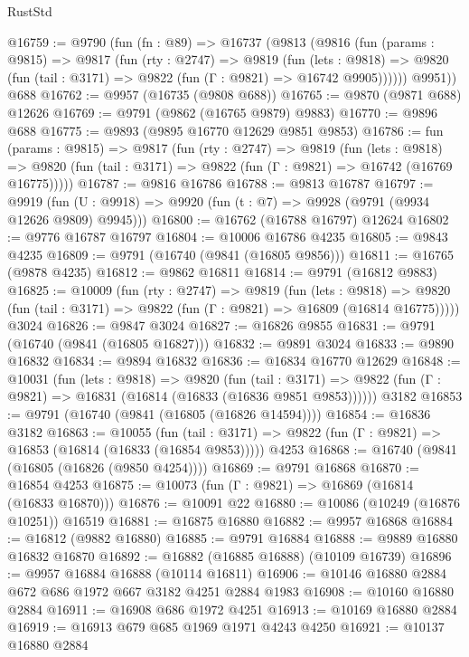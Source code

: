 \begin{lexlean}{RustStd}
\begin{coremodule}
@16759 := @9790
    (fun (fn : @89) =>
    @16737
      (@9813
        (@9816
          (fun (params : @9815) =>
          @9817
            (fun (rty : @2747) =>
            @9819
              (fun (lets : @9818) =>
              @9820 (fun (tail : @3171) => @9822 (fun (Γ : @9821) => @16742 @9905))))))
        @9951))
    @688
@16762 := @9957 (@16735 (@9808 @688))
@16765 := @9870 (@9871 @688) @12626
@16769 := @9791 (@9862 (@16765 @9879) @9883)
@16770 := @9896 @688
@16775 := @9893 (@9895 @16770 @12629 @9851 @9853)
@16786 := fun (params : @9815) =>
  @9817
    (fun (rty : @2747) =>
    @9819
      (fun (lets : @9818) =>
      @9820 (fun (tail : @3171) => @9822 (fun (Γ : @9821) => @16742 (@16769 @16775)))))
@16787 := @9816 @16786
@16788 := @9813 @16787
@16797 := @9919
    (fun (U : @9918) => @9920 (fun (t : @7) => @9928 (@9791 (@9934 @12626 @9809) @9945)))
@16800 := @16762 (@16788 @16797) @12624
@16802 := @9776 @16787 @16797
@16804 := @10006 @16786 @4235
@16805 := @9843 @4235
@16809 := @9791 (@16740 (@9841 (@16805 @9856)))
@16811 := @16765 (@9878 @4235)
@16812 := @9862 @16811
@16814 := @9791 (@16812 @9883)
@16825 := @10009
    (fun (rty : @2747) =>
    @9819
      (fun (lets : @9818) =>
      @9820 (fun (tail : @3171) => @9822 (fun (Γ : @9821) => @16809 (@16814 @16775)))))
    @3024
@16826 := @9847 @3024
@16827 := @16826 @9855
@16831 := @9791 (@16740 (@9841 (@16805 @16827)))
@16832 := @9891 @3024
@16833 := @9890 @16832
@16834 := @9894 @16832
@16836 := @16834 @16770 @12629
@16848 := @10031
    (fun (lets : @9818) =>
    @9820
      (fun (tail : @3171) =>
      @9822 (fun (Γ : @9821) => @16831 (@16814 (@16833 (@16836 @9851 @9853))))))
    @3182
@16853 := @9791 (@16740 (@9841 (@16805 (@16826 @14594))))
@16854 := @16836 @3182
@16863 := @10055
    (fun (tail : @3171) => @9822 (fun (Γ : @9821) => @16853 (@16814 (@16833 (@16854 @9853)))))
    @4253
@16868 := @16740 (@9841 (@16805 (@16826 (@9850 @4254))))
@16869 := @9791 @16868
@16870 := @16854 @4253
@16875 := @10073 (fun (Γ : @9821) => @16869 (@16814 (@16833 @16870)))
@16876 := @10091 @22
@16880 := @10086 (@10249 (@16876 @10251)) @16519
@16881 := @16875 @16880
@16882 := @9957 @16868
@16884 := @16812 (@9882 @16880)
@16885 := @9791 @16884
@16888 := @9889 @16880 @16832 @16870
@16892 := @16882 (@16885 @16888) (@10109 @16739)
@16896 := @9957 @16884 @16888 (@10114 @16811)
@16906 := @10146 @16880 @2884 @672 @686 @1972 @667 @3182 @4251 @2884 @1983
@16908 := @10160 @16880 @2884
@16911 := @16908 @686 @1972 @4251
@16913 := @10169 @16880 @2884
@16919 := @16913 @679 @685 @1969 @1971 @4243 @4250
@16921 := @10137 @16880 @2884

\end{coremodule}
\end{lexlean}
